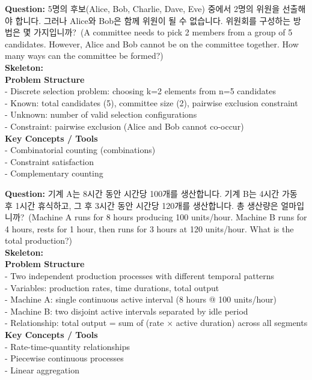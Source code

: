\begin{tcolorbox}[
  colback=blue!3,
  colframe=blue!50!black,
  boxrule=0.5pt,
  arc=4pt,
  left=6pt,
  right=6pt,
  top=4pt,
  bottom=4pt,
  title=Skeleton Few-shot Example 2~(Korean)
]
\small
\textbf{Question:} 5명의 후보(Alice, Bob, Charlie, Dave, Eve) 중에서 2명의 위원을 선출해야 합니다. 그러나 Alice와 Bob은 함께 위원이 될 수 없습니다. 위원회를 구성하는 방법은 몇 가지입니까?~(A committee needs to pick 2 members from a group of 5 candidates. However, Alice and Bob cannot be on the committee together. How many ways can the committee be formed?)\\[0.5em]

\textbf{Skeleton:}\\
\textbf{Problem Structure}\\
- Discrete selection problem: choosing k=2 elements from n=5 candidates\\
- Known: total candidates (5), committee size (2), pairwise exclusion constraint\\
- Unknown: number of valid selection configurations\\
- Constraint: pairwise exclusion (Alice and Bob cannot co-occur)\\[0.3em]
\textbf{Key Concepts / Tools}\\
- Combinatorial counting (combinations)\\
- Constraint satisfaction\\
- Complementary counting
\end{tcolorbox}

\begin{tcolorbox}[
  colback=blue!3,
  colframe=blue!50!black,
  boxrule=0.5pt,
  arc=4pt,
  left=6pt,
  right=6pt,
  top=4pt,
  bottom=4pt,
  title=Few-shot Example 3: Rate Problem
]
\small
\textbf{Question:} 기계 A는 8시간 동안 시간당 100개를 생산합니다. 기계 B는 4시간 가동 후 1시간 휴식하고, 그 후 3시간 동안 시간당 120개를 생산합니다. 총 생산량은 얼마입니까?~(Machine A runs for 8 hours producing 100 units/hour. Machine B runs for 4 hours, rests for 1 hour, then runs for 3 hours at 120 units/hour. What is the total production?)\\[0.5em]

\textbf{Skeleton:}\\
\textbf{Problem Structure}\\
- Two independent production processes with different temporal patterns\\
- Variables: production rates, time durations, total output\\
- Machine A: single continuous active interval (8 hours @ 100 units/hour)\\
- Machine B: two disjoint active intervals separated by idle period\\
- Relationship: total output = sum of (rate $\times$ active duration) across all segments\\[0.3em]
\textbf{Key Concepts / Tools}\\
- Rate-time-quantity relationships\\
- Piecewise continuous processes\\
- Linear aggregation
\end{tcolorbox}

